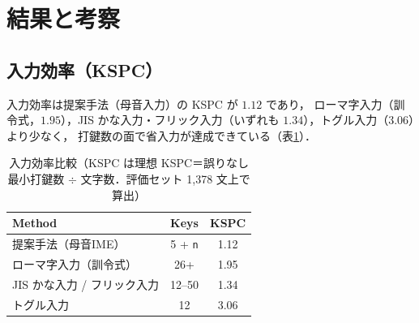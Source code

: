\section{結果と考察}

\newlength{\likertfull}\setlength{\likertfull}{18mm}%
\newcommand{\likert}[1]{%
  \begingroup
  \setlength{\fboxsep}{0pt}%
  \rlap{%
    \colorbox[gray]{0.45}{\rule{0pt}{7pt}\hspace{\dimexpr #1\likertfull/7\relax}}%
    \colorbox[gray]{0.88}{\rule{0pt}{7pt}\hspace{\dimexpr \likertfull - #1\likertfull/7\relax}}%
  }%
  \hspace{\dimexpr 4\likertfull/7\relax}\rule{0.3pt}{9pt}%
  \endgroup}

\subsection{入力効率（KSPC）}
入力効率は提案手法（母音入力）の KSPC が $1.12$ であり，
ローマ字入力（訓令式，$1.95$），JIS かな入力・フリック入力（いずれも $1.34$），トグル入力（$3.06$）より少なく，
打鍵数の面で省入力が達成できている（表\ref{tab:input}）．

\begin{table}[t]
  \centering\small
  \caption{入力効率比較（KSPC は理想 KSPC＝誤りなし最小打鍵数 $\div$ 文字数．評価セット 1{,}378 文上で算出）}
  \label{tab:input}
  \setlength{\tabcolsep}{4pt}
  \begin{tabular}{p{3.4cm}cc}
    \toprule
    Method & Keys & KSPC \\
    \midrule
    提案手法（母音IME）& 5 + \texttt{n} & 1.12 \\
    ローマ字入力（訓令式）& 26+ & 1.95 \\
    JIS かな入力 / フリック入力 & 12--50 & 1.34 \\
    トグル入力 & 12 & 3.06 \\
    \bottomrule
  \end{tabular}
\end{table}

